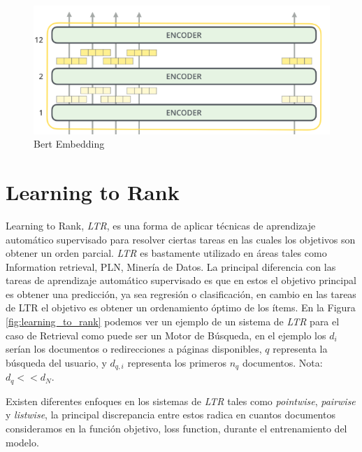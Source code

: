 \begin{figure}
\begin{center}
    \includegraphics[width=\textwidth]{images/image212.png}
    \caption{Bert Embedding}
    \label{fig:bert_embeddings}
\end{center}
\end{figure}

\section{Learning to Rank} \label{sec:LTR}

Learning to Rank, \textit{LTR}, es una forma de aplicar técnicas de aprendizaje automático supervisado para resolver ciertas tareas en las cuales los objetivos son obtener un orden parcial. \textit{LTR} es bastamente utilizado en áreas tales como Information retrieval, PLN, Minería de Datos. La principal diferencia con las tareas de aprendizaje automático supervisado es que en estos el objetivo principal es obtener una predicción, ya sea regresión o clasificación, en cambio en las tareas de LTR el objetivo es obtener un ordenamiento óptimo de los ítems. En la Figura \ref{fig:learning_to_rank} podemos ver un ejemplo de un sistema de \textit{LTR} para el caso de Retrieval como puede ser un Motor de Búsqueda, en el ejemplo los $d_{i}$ serían los documentos o redirecciones a páginas disponibles, $q$ representa la búsqueda del usuario, y $d_{q,i}$ representa los primeros $n_{q}$ documentos. Nota: $d_{q} << d_{N}$.

Existen diferentes enfoques en los sistemas de \textit{LTR} tales como \textit{pointwise}, \textit{pairwise} y \textit{listwise}, la principal discrepancia entre estos radica en cuantos documentos consideramos en la función objetivo, loss function, durante el entrenamiento del modelo.

